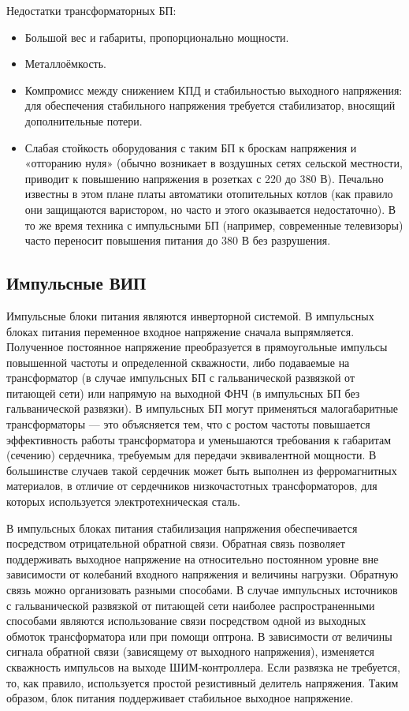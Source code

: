 \documentclass[unicode, 12pt, a4paper, oneside]{article}
\begin{document}
Недостатки трансформаторных БП:

\begin{itemize}
\item Большой вес и габариты, пропорционально мощности.
\item Металлоёмкость.
\item Компромисс между снижением КПД и стабильностью выходного напряжения: для обеспечения стабильного напряжения требуется стабилизатор, вносящий дополнительные потери.
\item Слабая стойкость оборудования с таким БП к броскам напряжения и «отгоранию нуля» (обычно возникает в воздушных сетях сельской местности, приводит к повышению напряжения в розетках с 220 до 380 В). Печально известны в этом плане платы автоматики отопительных котлов (как правило они защищаются варистором, но часто и этого оказывается недостаточно). В то же время техника с импульсными БП (например, современные телевизоры) часто переносит повышения питания до 380 В без разрушения.
\end{itemize}

\subsection*{Импульсные ВИП}

Импульсные блоки питания являются инверторной системой. В импульсных блоках питания переменное входное напряжение сначала выпрямляется. Полученное постоянное напряжение преобразуется в прямоугольные импульсы повышенной частоты и определенной скважности, либо подаваемые на трансформатор (в случае импульсных БП с гальванической развязкой от питающей сети) или напрямую на выходной ФНЧ (в импульсных БП без гальванической развязки). В импульсных БП могут применяться малогабаритные трансформаторы — это объясняется тем, что с ростом частоты повышается эффективность работы трансформатора и уменьшаются требования к габаритам (сечению) сердечника, требуемым для передачи эквивалентной мощности. В большинстве случаев такой сердечник может быть выполнен из ферромагнитных материалов, в отличие от сердечников низкочастотных трансформаторов, для которых используется электротехническая сталь.

В импульсных блоках питания стабилизация напряжения обеспечивается посредством отрицательной обратной связи. Обратная связь позволяет поддерживать выходное напряжение на относительно постоянном уровне вне зависимости от колебаний входного напряжения и величины нагрузки. Обратную связь можно организовать разными способами. В случае импульсных источников с гальванической развязкой от питающей сети наиболее распространенными способами являются использование связи посредством одной из выходных обмоток трансформатора или при помощи оптрона. В зависимости от величины сигнала обратной связи (зависящему от выходного напряжения), изменяется скважность импульсов на выходе ШИМ-контроллера. Если развязка не требуется, то, как правило, используется простой резистивный делитель напряжения. Таким образом, блок питания поддерживает стабильное выходное напряжение.
\end{document}
